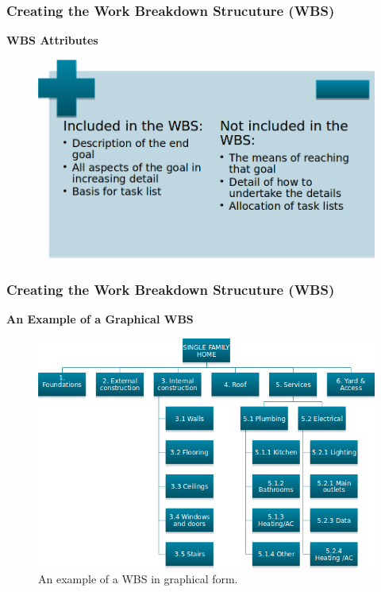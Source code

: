 \documentclass[aspectratio=169]{beamer}
\begin{document}

\begin{frame}
\frametitle{Creating the Work Breakdown Strucuture (WBS)}
\textbf{WBS Attributes}
\begin{figure}
\includegraphics[scale=0.45]{wbs_att}
\end{figure}
\end{frame}


\begin{frame}
\frametitle{Creating the Work Breakdown Strucuture (WBS)}
\textbf{An Example of a Graphical WBS}
\begin{figure}
\includegraphics[scale=0.5]{wbs_graph}
\caption{An example of a WBS in graphical form.}
\end{figure}
\end{frame}
\end{document}
